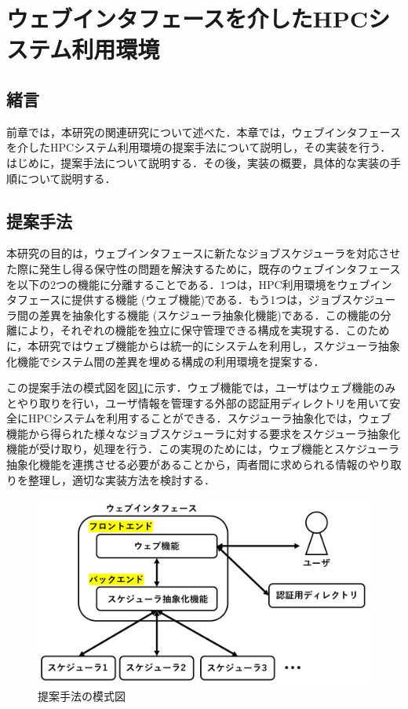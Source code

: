
\section{ウェブインタフェースを介したHPCシステム利用環境}

\subsection{緒言}
前章では，本研究の関連研究について述べた．本章では，ウェブインタフェースを介したHPCシステム利用環境の提案手法について説明し，その実装を行う．はじめに，提案手法について説明する．その後，実装の概要，具体的な実装の手順について説明する．\par

\subsection{提案手法}
本研究の目的は，ウェブインタフェースに新たなジョブスケジューラを対応させた際に発生し得る保守性の問題を解決するために，既存のウェブインタフェースを以下の2つの機能に分離することである．1つは，HPC利用環境をウェブインタフェースに提供する機能 (ウェブ機能)である．もう1つは，ジョブスケジューラ間の差異を抽象化する機能 (スケジューラ抽象化機能)である．この機能の分離により，それぞれの機能を独立に保守管理できる構成を実現する．このために，本研究ではウェブ機能からは統一的にシステムを利用し，スケジューラ抽象化機能でシステム間の差異を埋める構成の利用環境を提案する．\par
この提案手法の模式図を図\ref{fig6}に示す．ウェブ機能では，ユーザはウェブ機能のみとやり取りを行い，ユーザ情報を管理する外部の認証用ディレクトリを用いて安全にHPCシステムを利用することができる．スケジューラ抽象化では，ウェブ機能から得られた様々なジョブスケジューラに対する要求をスケジューラ抽象化機能が受け取り，処理を行う．この実現のためには，ウェブ機能とスケジューラ抽象化機能を連携させる必要があることから，両者間に求められる情報のやり取りを整理し，適切な実装方法を検討する．\par

\begin{figure}[tb]
    \centering
    \includegraphics[width=120mm]{./fig/proposed_method.png}
    \caption{提案手法の模式図}
    \label{fig6}
\end{figure}

